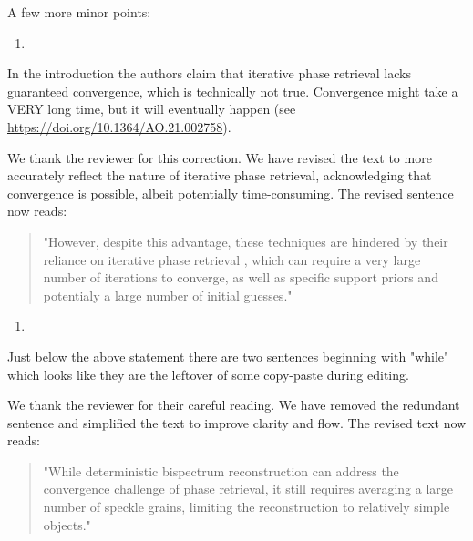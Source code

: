 \documentclass[12pt]{article}
\newcommand{\hlred}[1]{\sethlcolor{red!30}\hl{#1}}
\newenvironment{solved_reviewercomment}
    {\begin{tcolorbox}[width=\linewidth,colback=gray!5,colframe=solved_commentcolor!50,title=Reviewer Comment,left=5pt,right=5pt]}
    {\end{tcolorbox}}
\newenvironment{ourresponse}
    {\begin{tcolorbox}[width=\linewidth,breakable,enhanced,colback=gray!5,colframe=responsecolor!50,title=Response,left=5pt,right=5pt]}
    {\end{tcolorbox}}
\begin{document}
A few more minor points:

\begin{enumerate}[label=\arabic*., resume]
\item \leavevmode
\end{enumerate}
\vspace{-1em}
\begin{solved_reviewercomment}
    In the introduction the authors claim that iterative phase retrieval lacks guaranteed convergence, which is technically not true. Convergence might take a VERY long time, but it will eventually happen (see \url{https://doi.org/10.1364/AO.21.002758}).
\end{solved_reviewercomment}


\begin{ourresponse}
    We thank the reviewer for this correction. We have revised the text to more accurately reflect the nature of iterative phase retrieval, acknowledging that convergence is possible, albeit potentially time-consuming. The revised sentence now reads:  
    \begin{quote}
        "However, despite this advantage, these techniques are hindered by their reliance on iterative phase retrieval \cite{fienup1978reconstruction}, which can require a very large number of iterations to converge, as well as specific support priors and potentialy a large number of initial guesses."
    \end{quote}
    
\end{ourresponse}



\begin{enumerate}[label=\arabic*., resume]
\item \leavevmode
\end{enumerate}
\vspace{-1em}
\begin{solved_reviewercomment}
    Just below the above statement there are two sentences beginning with "while" which looks like they are the leftover of some copy-paste during editing.
\end{solved_reviewercomment}
\begin{ourresponse}
    We thank the reviewer for their careful reading. We have removed the redundant sentence and simplified the text to improve clarity and flow. The revised text now reads:
    \begin{quote}
        "While deterministic bispectrum reconstruction can address the convergence challenge of phase retrieval, it still requires averaging a large number of speckle grains, limiting the reconstruction to relatively simple objects."
    \end{quote}
\end{ourresponse}
\end{document}
